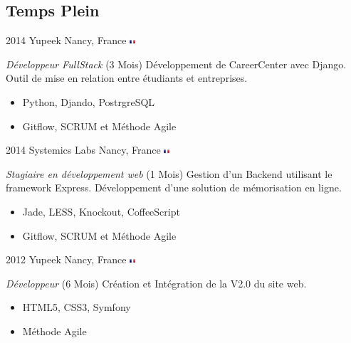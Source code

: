 \documentclass[]{friggeri-cv} %
\begin{document}
\subsection{Temps Plein}
\begin{entrylist}
\entry
{2014}
{Yupeek}
{Nancy, France {\includegraphics[height=0.2cm]{./flags/fr.png}}}
{\textit{Développeur FullStack} (3 Mois)\newline
Développement de CareerCenter avec Django.\newline
Outil de mise en relation entre étudiants et entreprises.
\begin{itemize}
\item Python, Djando, PostrgreSQL
\item Gitflow, SCRUM et Méthode Agile
\end{itemize}}
\entry
{2014}
{Systemics Labs}
{Nancy, France {\includegraphics[height=0.2cm]{./flags/fr.png}}}
{\textit{Stagiaire en développement web} (1 Mois)\newline
Gestion d'un Backend utilisant le framework Express.\newline
Développement d'une solution de mémorisation en ligne.
\begin{itemize}
\item Jade, LESS, Knockout, CoffeeScript
\item Gitflow, SCRUM et Méthode Agile
\end{itemize}}
\entry
{2012}
{Yupeek}
{Nancy, France {\includegraphics[height=0.2cm]{./flags/fr.png}}}
{\emph{Développeur} (6 Mois)\newline
Création et Intégration de la V2.0 du site web.
\begin{itemize}
\item HTML5, CSS3, Symfony
\item Méthode Agile
\end{itemize}}
\end{entrylist}
\end{document}
